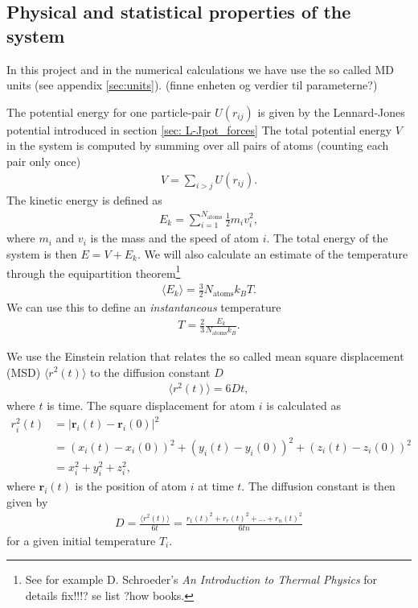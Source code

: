 \documentclass[11pt,a4wide]{article}
\renewcommand{\vec}{\mathbf}
\begin{document}
\subsection{Physical and statistical properties of the system} \label{sec: statistics_theory}
In this project and in the numerical calculations we have use the so called MD units (see appendix \ref{sec:units}). (finne enheten og verdier til parameterne?)



The potential energy for one particle-pair $U(r_{ij})$ is given by the Lennard-Jones potential introduced in section \ref{sec: L-Jpot_forces} The total potential energy $V$ in the system is computed by summing over all pairs of atoms (counting each pair only once) 
\begin{align}
	V = \sum_{i>j} U(r_{ij}).
\end{align}
The kinetic energy is defined as
\begin{align}
	E_k = \sum_{i=1}^{N_\text{atoms}} \frac{1}{2} m_i v_i^2,
\end{align}
where $m_i$ and $v_i$ is the mass and the speed of atom $i$. The total energy of the system is then $E = V + E_k$. We will also calculate an estimate of the temperature through the equipartition theorem\footnote{See for example D. Schroeder's \textit{An Introduction to Thermal Physics} for details fix!!!? se list ?how books.}
\begin{align}
	\langle E_k \rangle = \frac{3}{2}N_\text{atoms} k_B T.
\end{align}
We can use this to define an \textit{instantaneous} temperature
\begin{align}
	\label{eq:temperature}
	T = \frac{2}{3}\frac{E_k}{N_\text{atoms} k_B}.
\end{align}

We use the Einstein relation that relates the so called mean square displacement (MSD) $\langle r^2(t) \rangle$ to the diffusion constant $D$
\begin{align}
	\langle r^2(t) \rangle = 6Dt,
\end{align}
where $t$ is time. The square displacement for atom $i$ is calculated as
\begin{align}
	r_i^2(t) &= |\vec r_i(t) - \vec r_i(0)|^2 \\
	&= (x_i(t)-x_i(0))^2 + (y_i(t)-y_i(0))^2 + (z_i(t)-z_i(0))^2 \\
	&= x_i^2 + y_i^2 + z_i^2,
\end{align}
where $\vec r_i(t)$ is the position of atom $i$ at time $t$. The diffusion constant is then given by
\begin{align*}
D = \frac{\langle r^2(t) \rangle}{6t} = \frac{r_1(t)^2 + r_r(t)^2 + \dots + r_n(t)^2}{6tn}
\end{align*}
for a given initial temperature $T_i$.
\end{document}
